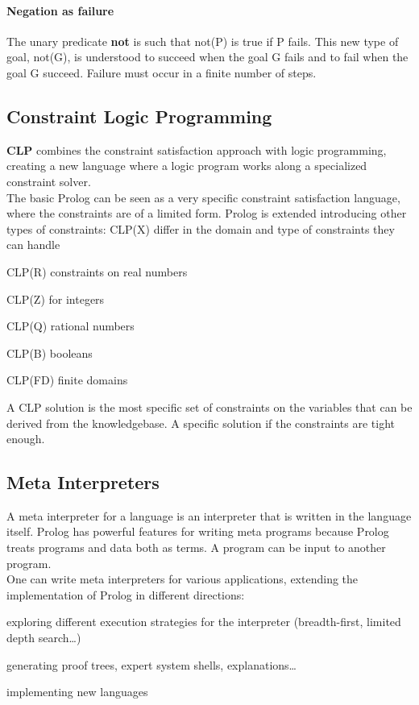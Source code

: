 \documentclass[10pt]{report}
\begin{document}
\paragraph{Negation as failure} The unary predicate \textbf{not} is such that not(P) is true if P fails. This new type of goal, not(G), is understood to succeed when the goal G fails and to fail when the goal G succeed. Failure must occur in a finite number of steps.
\subsection{Constraint Logic Programming} \textbf{CLP} combines the constraint satisfaction approach with logic programming, creating a new language where a logic program works along a specialized constraint solver.\\
The basic Prolog can be seen as a very specific constraint satisfaction language, where the constraints are of a limited form. Prolog is extended introducing other types of constraints: CLP(X) differ in the domain and type of constraints they can handle
\begin{list}{}{}
	\item CLP(R) constraints on real numbers
	\item CLP(Z) for integers
	\item CLP(Q) rational numbers
	\item CLP(B) booleans
	\item CLP(FD) finite domains
\end{list}
A CLP solution is the most specific set of constraints on the variables that can be derived from the knowledgebase. A specific solution if the constraints are tight enough.
\subsection{Meta Interpreters} A meta interpreter for a language is an interpreter that is written in the language itself. Prolog has powerful features for writing meta programs because Prolog treats programs and data both as terms. A program can be input to another program.\\
One can write meta interpreters for various applications, extending the implementation of Prolog in different directions:
\begin{list}{}{}
	\item exploring different execution strategies for the interpreter (breadth-first, limited depth search\ldots)
	\item generating proof trees, expert system shells, explanations\ldots
	\item implementing new languages
\end{list}
\end{document}
